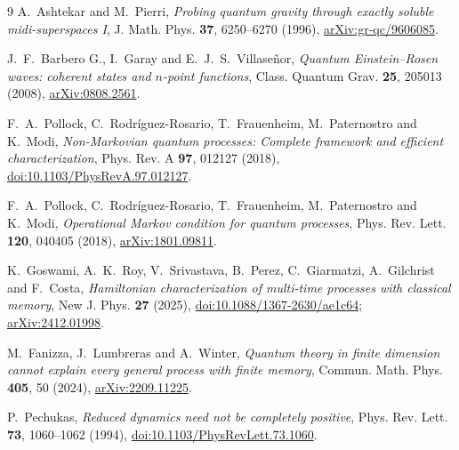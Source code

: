 \documentclass[11pt]{article}
\begin{document}
\begin{thebibliography}{9}
A.~Ashtekar and M.~Pierri,
\emph{Probing quantum gravity through exactly soluble midi-superspaces I},
J. Math. Phys. \textbf{37}, 6250--6270 (1996),
\href{https://arxiv.org/abs/gr-qc/9606085}{arXiv:gr-qc/9606085}.

J.~F.~Barbero G., I.~Garay and E.~J.~S.~Villase\~nor,
\emph{Quantum Einstein--Rosen waves: coherent states and \(n\)-point functions},
Class. Quantum Grav. \textbf{25}, 205013 (2008),
\href{https://arxiv.org/abs/0808.2561}{arXiv:0808.2561}.

F.~A.~Pollock, C.~Rodr\'iguez-Rosario, T.~Frauenheim, M.~Paternostro and K.~Modi,
\emph{Non-Markovian quantum processes: Complete framework and efficient characterization},
Phys. Rev. A \textbf{97}, 012127 (2018),
\href{https://doi.org/10.1103/PhysRevA.97.012127}{doi:10.1103/PhysRevA.97.012127}.

F.~A.~Pollock, C.~Rodr\'iguez-Rosario, T.~Frauenheim, M.~Paternostro and K.~Modi,
\emph{Operational Markov condition for quantum processes},
Phys. Rev. Lett. \textbf{120}, 040405 (2018),
\href{https://arxiv.org/abs/1801.09811}{arXiv:1801.09811}.

K.~Goswami, A.~K.~Roy, V.~Srivastava, B.~Perez, C.~Giarmatzi, A.~Gilchrist and F.~Costa,
\emph{Hamiltonian characterization of multi-time processes with classical memory},
New J. Phys. \textbf{27} (2025),
\href{https://doi.org/10.1088/1367-2630/ae1c64}{doi:10.1088/1367-2630/ae1c64};
\href{https://arxiv.org/abs/2412.01998}{arXiv:2412.01998}.

M.~Fanizza, J.~Lumbreras and A.~Winter,
\emph{Quantum theory in finite dimension cannot explain every general process with finite memory},
Commun. Math. Phys. \textbf{405}, 50 (2024),
\href{https://arxiv.org/abs/2209.11225}{arXiv:2209.11225}.

P.~Pechukas, \emph{Reduced dynamics need not be completely positive},
Phys. Rev. Lett. \textbf{73}, 1060--1062 (1994),
\href{https://doi.org/10.1103/PhysRevLett.73.1060}{doi:10.1103/PhysRevLett.73.1060}.
\end{thebibliography}
\end{document}
